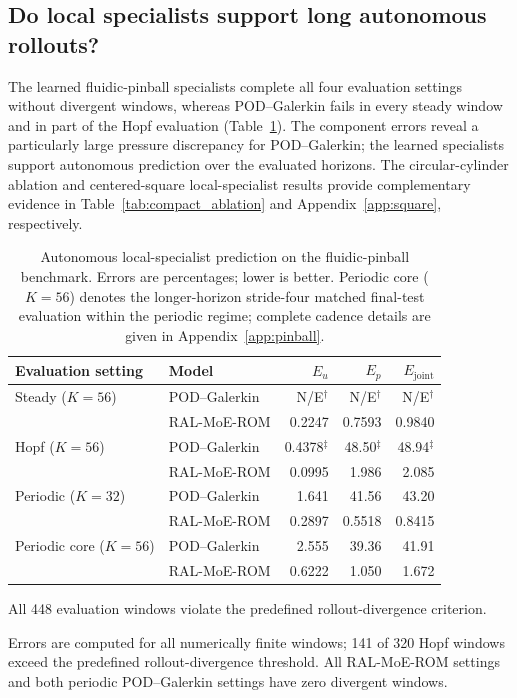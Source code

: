 \subsection{Do local specialists support long autonomous rollouts?}

The learned fluidic-pinball specialists complete all four evaluation settings
without divergent windows, whereas POD--Galerkin fails in every steady window
and in part of the Hopf evaluation (Table~\ref{tab:pinball_autonomous}).
The component errors reveal a particularly large pressure discrepancy for
POD--Galerkin; the learned specialists support autonomous prediction over the
evaluated horizons.
The circular-cylinder ablation and centered-square local-specialist results
provide complementary evidence in Table~\ref{tab:compact_ablation} and
Appendix~\ref{app:square}, respectively.

\begin{table}[t]
\centering
\caption{Autonomous local-specialist prediction on the fluidic-pinball benchmark.
Errors are percentages; lower is better. Periodic core ($K=56$) denotes the
longer-horizon stride-four matched final-test evaluation within the periodic
regime; complete cadence details are given in Appendix~\ref{app:pinball}.}
\label{tab:pinball_autonomous}
\small
\setlength{\tabcolsep}{5pt}
\begin{threeparttable}
\begin{tabular}{@{}llrrr@{}}
\toprule
Evaluation setting & Model & $E_u$ & $E_p$ & $E_{\mathrm{joint}}$ \\
\midrule
Steady ($K=56$) & POD--Galerkin & N/E$^\dagger$ & N/E$^\dagger$ & N/E$^\dagger$ \\
 & RAL-MoE-ROM & 0.2247 & 0.7593 & 0.9840 \\
\addlinespace
Hopf ($K=56$) & POD--Galerkin & 0.4378$^\ddagger$ & 48.50$^\ddagger$ & 48.94$^\ddagger$ \\
 & RAL-MoE-ROM & 0.0995 & 1.986 & 2.085 \\
\addlinespace
Periodic ($K=32$) & POD--Galerkin & 1.641 & 41.56 & 43.20 \\
 & RAL-MoE-ROM & 0.2897 & 0.5518 & 0.8415 \\
\addlinespace
Periodic core ($K=56$) & POD--Galerkin & 2.555 & 39.36 & 41.91 \\
 & RAL-MoE-ROM & 0.6222 & 1.050 & 1.672 \\
\bottomrule
\end{tabular}
\begin{tablenotes}[flushleft]
\footnotesize
\item[$\dagger$] All 448 evaluation windows violate the predefined rollout-divergence criterion.
\item[$\ddagger$] Errors are computed for all numerically finite windows;
141 of 320 Hopf windows exceed the predefined rollout-divergence threshold.
All RAL-MoE-ROM settings and both periodic POD--Galerkin settings have zero divergent windows.
\end{tablenotes}
\end{threeparttable}
\end{table}

